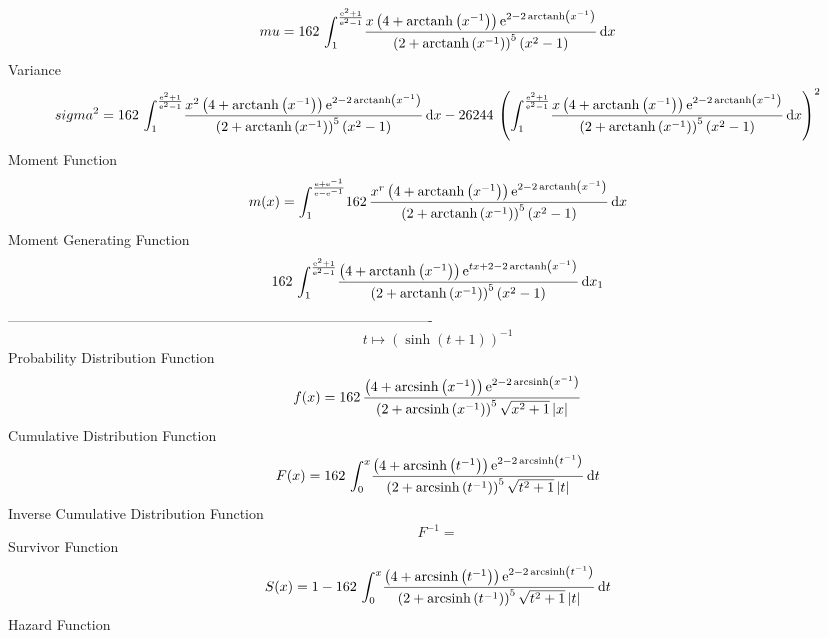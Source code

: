 \documentclass[12pt]{article}
\begin{document}
 $$ mu=162\,\int_{1}^{{\frac {{{\rm e}^{2}}+1}{{{\rm e}^{2}}-1}}}\!{\frac {x
 \left( 4+{\rm arctanh} \left({x}^{-1}\right) \right) {{\rm e}^{2-2\,
{\rm arctanh} \left({x}^{-1}\right)}}}{ \left( 2+{\rm arctanh} \left({
x}^{-1}\right) \right) ^{5} \left( {x}^{2}-1 \right) }}\,{\rm d}x
$$ Variance 
 $$ sigma^2 = 162\,\int_{1}^{{\frac {{{\rm e}^{2}}+1}{{{\rm e}^{2}}-1}}}\!{\frac {{x
}^{2} \left( 4+{\rm arctanh} \left({x}^{-1}\right) \right) {{\rm e}^{2
-2\,{\rm arctanh} \left({x}^{-1}\right)}}}{ \left( 2+{\rm arctanh} 
\left({x}^{-1}\right) \right) ^{5} \left( {x}^{2}-1 \right) }}
\,{\rm d}x-26244\, \left( \int_{1}^{{\frac {{{\rm e}^{2}}+1}{{{\rm e}^
{2}}-1}}}\!{\frac {x \left( 4+{\rm arctanh} \left({x}^{-1}\right)
 \right) {{\rm e}^{2-2\,{\rm arctanh} \left({x}^{-1}\right)}}}{
 \left( 2+{\rm arctanh} \left({x}^{-1}\right) \right) ^{5} \left( {x}^
{2}-1 \right) }}\,{\rm d}x \right) ^{2}
$$Moment Function 
 $$ m(x) = \int_{1}^{{\frac {{\rm e}+{{\rm e}^{-1}}}{{\rm e}-{{\rm e}^{-1}}}}}\!
162\,{\frac {{x}^{r} \left( 4+{\rm arctanh} \left({x}^{-1}\right)
 \right) {{\rm e}^{2-2\,{\rm arctanh} \left({x}^{-1}\right)}}}{
 \left( 2+{\rm arctanh} \left({x}^{-1}\right) \right) ^{5} \left( {x}^
{2}-1 \right) }}\,{\rm d}x
$$ Moment Generating Function 
 $$162\,\int_{1}^{{\frac {{{\rm e}^{2}}+1}{{{\rm e}^{2}}-1}}}\!{\frac {
 \left( 4+{\rm arctanh} \left({x}^{-1}\right) \right) {{\rm e}^{tx+2-2
\,{\rm arctanh} \left({x}^{-1}\right)}}}{ \left( 2+{\rm arctanh} 
\left({x}^{-1}\right) \right) ^{5} \left( {x}^{2}-1 \right) }}
\,{\rm d}x_{{1}}
$$-------------------------------------------------------------------------------------------  \\$$t\mapsto  \left( \sinh \left( t+1 \right)  \right) ^{-1}
$$Probability Distribution Function 
$$  f(x)=162\,{\frac { \left( 4+{\rm arcsinh} \left({x}^{-1}\right) \right) {
{\rm e}^{2-2\,{\rm arcsinh} \left({x}^{-1}\right)}}}{ \left( 2+
{\rm arcsinh} \left({x}^{-1}\right) \right) ^{5}\sqrt {{x}^{2}+1}
 \left| x \right| }}
$$Cumulative Distribution Function  
 $$F(x)=162\,\int_{0}^{x}\!{\frac { \left( 4+{\rm arcsinh} \left({t}^{-1}
\right) \right) {{\rm e}^{2-2\,{\rm arcsinh} \left({t}^{-1}\right)}}}{
 \left( 2+{\rm arcsinh} \left({t}^{-1}\right) \right) ^{5}\sqrt {{t}^{
2}+1} \left| t \right| }}\,{\rm d}t
$$ Inverse Cumulative Distribution Function 
  $$F^{-1} = $$Survivor Function 
 $$ S(x)=1-162\,\int_{0}^{x}\!{\frac { \left( 4+{\rm arcsinh} \left({t}^{-1}
\right) \right) {{\rm e}^{2-2\,{\rm arcsinh} \left({t}^{-1}\right)}}}{
 \left( 2+{\rm arcsinh} \left({t}^{-1}\right) \right) ^{5}\sqrt {{t}^{
2}+1} \left| t \right| }}\,{\rm d}t
$$ Hazard Function 
\end{document}
